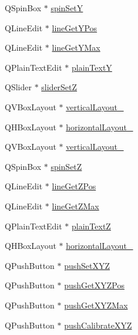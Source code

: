 \begin{DoxyCompactItemize}
\item 
Q\+Spin\+Box $\ast$ \hyperlink{class_ui___e3_p_j_r_a855f6972ba1dc6a61308080e1dea2447}{spin\+SetY}
\item 
Q\+Line\+Edit $\ast$ \hyperlink{class_ui___e3_p_j_r_af7a504d650e35e560d66d6e9cc2ec20e}{line\+Get\+Y\+Pos}
\item 
Q\+Line\+Edit $\ast$ \hyperlink{class_ui___e3_p_j_r_a6db76c359ac491d1e084a0febda62fa8}{line\+Get\+Y\+Max}
\item 
Q\+Plain\+Text\+Edit $\ast$ \hyperlink{class_ui___e3_p_j_r_aded895240a26d5b3349be548e863fcd2}{plain\+TextY}
\item 
Q\+Slider $\ast$ \hyperlink{class_ui___e3_p_j_r_a6ef8bc7a96e71c14d44d1573f43506d4}{slider\+SetZ}
\item 
Q\+V\+Box\+Layout $\ast$ \hyperlink{class_ui___e3_p_j_r_acbe0600e63ca9c63fe807730289e677a}{vertical\+Layout\+\_}
\item 
Q\+H\+Box\+Layout $\ast$ \hyperlink{class_ui___e3_p_j_r_aee7bbbb4f14e80e5c3821623d9c4d52b}{horizontal\+Layout\+\_}
\item 
Q\+V\+Box\+Layout $\ast$ \hyperlink{class_ui___e3_p_j_r_aecbd2cafbe12abcd4a5a7865aad8d917}{vertical\+Layout\+\_}
\item 
Q\+Spin\+Box $\ast$ \hyperlink{class_ui___e3_p_j_r_a1c5f1bef8dc94bae1a91139a37d1d881}{spin\+SetZ}
\item 
Q\+Line\+Edit $\ast$ \hyperlink{class_ui___e3_p_j_r_af271cd40f5223cbdb1803e41493746cc}{line\+Get\+Z\+Pos}
\item 
Q\+Line\+Edit $\ast$ \hyperlink{class_ui___e3_p_j_r_a4bd5e082a2fb51522d5606ed355289d5}{line\+Get\+Z\+Max}
\item 
Q\+Plain\+Text\+Edit $\ast$ \hyperlink{class_ui___e3_p_j_r_aa688da4507156fb25ab31678d45842c9}{plain\+TextZ}
\item 
Q\+H\+Box\+Layout $\ast$ \hyperlink{class_ui___e3_p_j_r_a535a43287b7a5605cfc11580d146d3fb}{horizontal\+Layout\+\_}
\item 
Q\+Push\+Button $\ast$ \hyperlink{class_ui___e3_p_j_r_a95989982eaebbf117db602b9c5642fc5}{push\+Set\+X\+YZ}
\item 
Q\+Push\+Button $\ast$ \hyperlink{class_ui___e3_p_j_r_a5a172ff2cdd7f0b1731e866267981cd4}{push\+Get\+X\+Y\+Z\+Pos}
\item 
Q\+Push\+Button $\ast$ \hyperlink{class_ui___e3_p_j_r_a16f1701307e43c614a3c0aed623577b7}{push\+Get\+X\+Y\+Z\+Max}
\item 
Q\+Push\+Button $\ast$ \hyperlink{class_ui___e3_p_j_r_a0a82bc71b94b2c607f872cbcf936811a}{push\+Calibrate\+X\+YZ}
\end{DoxyCompactItemize}


